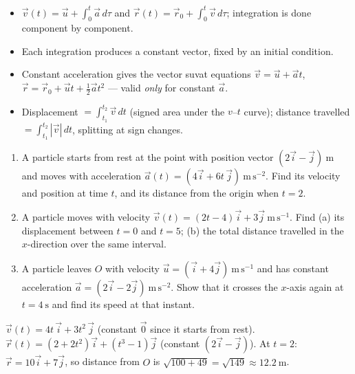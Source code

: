 \documentclass[11pt]{article}
\begin{document}
\begin{aretenir}
\begin{itemize}
\item $\vec{v}(t) = \vec{u} + \displaystyle\int_0^t \vec{a}\,d\tau$ and $\vec{r}(t) = \vec{r}_0 + \displaystyle\int_0^t \vec{v}\,d\tau$; integration is done component by component.
\item Each integration produces a constant vector, fixed by an initial condition.
\item Constant acceleration gives the vector suvat equations $\vec{v} = \vec{u} + \vec{a}t$, $\vec{r} = \vec{r}_0 + \vec{u}t + \tfrac12\vec{a}t^2$ --- valid \emph{only} for constant $\vec{a}$.
\item Displacement $= \displaystyle\int_{t_1}^{t_2}\vec{v}\,dt$ (signed area under the $v$--$t$ curve); distance travelled $= \displaystyle\int_{t_1}^{t_2}|\vec{v}|\,dt$, splitting at sign changes.
\end{itemize}
\end{aretenir}

\begin{exercice}[Practice]
\begin{enumerate}
\item A particle starts from rest at the point with position vector $(2\vec{i} - \vec{j})\ \mathrm{m}$ and moves with acceleration $\vec{a}(t) = (4\vec{i} + 6t\,\vec{j})\ \mathrm{m\,s^{-2}}$. Find its velocity and position at time $t$, and its distance from the origin when $t = 2$.
\item A particle moves with velocity $\vec{v}(t) = (2t - 4)\vec{i} + 3\vec{j}\ \mathrm{m\,s^{-1}}$. Find (a) its displacement between $t = 0$ and $t = 5$; (b) the total distance travelled in the $x$-direction over the same interval.
\item A particle leaves $O$ with velocity $\vec{u} = (\vec{i} + 4\vec{j})\ \mathrm{m\,s^{-1}}$ and has constant acceleration $\vec{a} = (2\vec{i} - 2\vec{j})\ \mathrm{m\,s^{-2}}$. Show that it crosses the $x$-axis again at $t = 4\ \mathrm{s}$ and find its speed at that instant.
\end{enumerate}
\end{exercice}

\begin{corrige}[Exercise 1]
$\vec{v}(t) = 4t\,\vec{i} + 3t^2\,\vec{j}$ (constant $\vec{0}$ since it starts from rest). $\vec{r}(t) = (2 + 2t^2)\vec{i} + (t^3 - 1)\vec{j}$ (constant $(2\vec{i} - \vec{j})$). At $t = 2$: $\vec{r} = 10\vec{i} + 7\vec{j}$, so distance from $O$ is $\sqrt{100 + 49} = \sqrt{149} \approx 12.2\ \mathrm{m}$.
\end{corrige}
\end{document}
